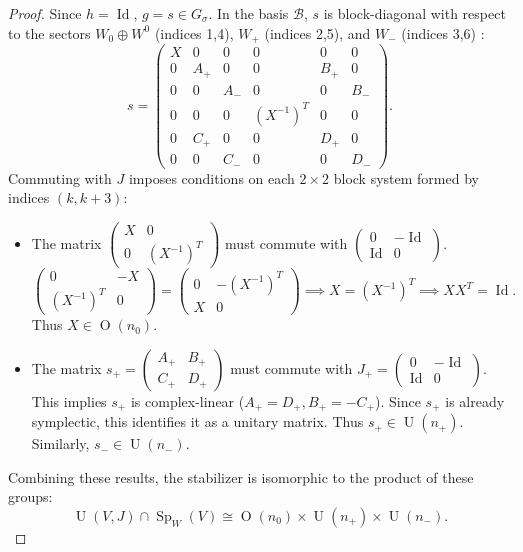\documentclass[12pt, final]{article}
\def\Sp{\operatorname{Sp}}
\def\U{\operatorname{U}}
\def\O{\operatorname{O}}
\def\Id{\operatorname{Id}}
\begin{document}
\begin{proof}
Since $h=\Id$, $g = s \in G_\sigma$. In the basis $\mathcal{B}$, $s$ is block-diagonal with respect to the sectors $W_0 \oplus W^0$ (indices 1,4), $W_+$ (indices 2,5), and $W_-$ (indices 3,6) :
\[
s = \begin{pmatrix}
X & 0 & 0 & 0 & 0 & 0 \\
0 & A_+ & 0 & 0 & B_+ & 0 \\
0 & 0 & A_- & 0 & 0 & B_- \\
0 & 0 & 0 & (X^{-1})^T & 0 & 0 \\
0 & C_+ & 0 & 0 & D_+ & 0 \\
0 & 0 & C_- & 0 & 0 & D_-
\end{pmatrix}.
\]
Commuting with $J$ imposes conditions on each $2 \times 2$ block system formed by indices $(k, k+3)$:
\begin{itemize}
    \item The matrix $\left(\begin{smallmatrix} X & 0 \\ 0 & (X^{-1})^T \end{smallmatrix}\right)$ must commute with $\left(\begin{smallmatrix} 0 & -\Id \\ \Id & 0 \end{smallmatrix}\right)$.
    \[
    \begin{pmatrix} 0 & -X \\ (X^{-1})^T & 0 \end{pmatrix} = \begin{pmatrix} 0 & -(X^{-1})^T \\ X & 0 \end{pmatrix} \implies X = (X^{-1})^T \implies XX^T = \Id.
    \]
    Thus $X \in \O(n_0)$.
    \item The matrix $s_+ = \left(\begin{smallmatrix} A_+ & B_+ \\ C_+ & D_+ \end{smallmatrix}\right)$ must commute with $J_+ = \left(\begin{smallmatrix} 0 & -\Id \\ \Id & 0 \end{smallmatrix}\right)$. This implies $s_+$ is complex-linear ($A_+=D_+, B_+=-C_+$). Since $s_+$ is already symplectic, this identifies it as a unitary matrix.
    Thus $s_+ \in \U(n_+)$. Similarly, $s_- \in \U(n_-)$.
\end{itemize}

Combining these results, the stabilizer is isomorphic to the product of these groups:
\[
\U(V, J) \cap \Sp_W(V) \cong \O(n_0) \times \U(n_+) \times \U(n_-). 
\]
\end{proof}
\end{document}
